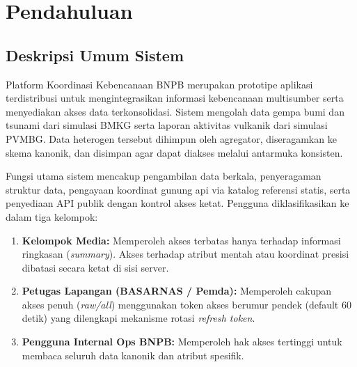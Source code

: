 \chapter{Pendahuluan}

\section{Deskripsi Umum Sistem}
Platform Koordinasi Kebencanaan BNPB merupakan prototipe aplikasi terdistribusi untuk mengintegrasikan informasi kebencanaan multisumber serta menyediakan akses data terkonsolidasi. Sistem mengolah data gempa bumi dan tsunami dari simulasi BMKG serta laporan aktivitas vulkanik dari simulasi PVMBG. Data heterogen tersebut dihimpun oleh agregator, diseragamkan ke skema kanonik, dan disimpan agar dapat diakses melalui antarmuka konsisten.

Fungsi utama sistem mencakup pengambilan data berkala, penyeragaman struktur data, pengayaan koordinat gunung api via katalog referensi statis, serta penyediaan API publik dengan kontrol akses ketat. Pengguna diklasifikasikan ke dalam tiga kelompok:
\begin{enumerate}
    \item \textbf{Kelompok Media:} Memperoleh akses terbatas hanya terhadap informasi ringkasan (\textit{summary}). Akses terhadap atribut mentah atau koordinat presisi dibatasi secara ketat di sisi server.
    \item \textbf{Petugas Lapangan (BASARNAS / Pemda):} Memperoleh cakupan akses penuh (\textit{raw/all}) menggunakan token akses berumur pendek (default 60 detik) yang dilengkapi mekanisme rotasi \textit{refresh token}.
    \item \textbf{Pengguna Internal Ops BNPB:} Memperoleh hak akses tertinggi untuk membaca seluruh data kanonik dan atribut spesifik.
\end{enumerate}

